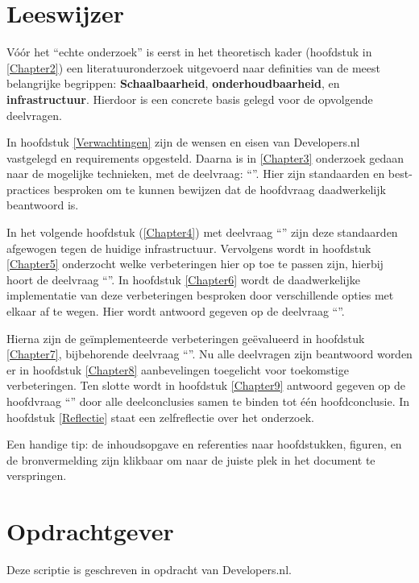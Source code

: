 \section{Leeswijzer}

Vóór het \enquote{echte onderzoek} is eerst in het theoretisch kader (hoofdstuk in \ref{Chapter2}) een literatuuronderzoek uitgevoerd naar definities van de meest belangrijke begrippen: \textbf{Schaalbaarheid}, \textbf{onderhoudbaarheid}, en \textbf{infrastructuur}. Hierdoor is een concrete basis gelegd voor de opvolgende deelvragen. 

In hoofdstuk \ref{Verwachtingen} zijn de wensen en eisen van Developers.nl vastgelegd en requirements opgesteld. Daarna is in \ref{Chapter3} onderzoek gedaan naar de mogelijke technieken, met de deelvraag: \enquote{\deeltechnieken}. Hier zijn standaarden en best-practices besproken om te kunnen bewijzen dat de hoofdvraag daadwerkelijk beantwoord is. 

In het volgende hoofdstuk (\ref{Chapter4}) met deelvraag \enquote{\deelhuidig} zijn deze standaarden afgewogen tegen de huidige infrastructuur. Vervolgens wordt in hoofdstuk \ref{Chapter5} onderzocht welke verbeteringen hier op toe te passen zijn, hierbij hoort de deelvraag \enquote{\deelverbetering}. In hoofdstuk \ref{Chapter6} wordt de daadwerkelijke implementatie van deze verbeteringen besproken door verschillende opties met elkaar af te wegen. Hier wordt antwoord gegeven op de deelvraag \enquote{\deelverbetering}. 

Hierna zijn de geïmplementeerde verbeteringen geëvalueerd in hoofdstuk \ref{Chapter7}, bijbehorende deelvraag \enquote{\deelrequirements}. Nu alle deelvragen zijn beantwoord worden er in hoofdstuk \ref{Chapter8} aanbevelingen toegelicht voor toekomstige verbeteringen. Ten slotte wordt in hoofdstuk \ref{Chapter9} antwoord gegeven op de hoofdvraag \enquote{\hoofdvraagname} door alle deelconclusies samen te binden tot één hoofdconclusie. In hoofdstuk \ref{Reflectie} staat een zelfreflectie over het onderzoek.

Een handige tip: de inhoudsopgave en referenties naar hoofdstukken, figuren, en de bronvermelding zijn klikbaar om naar de juiste plek in het document te verspringen.

\section{Opdrachtgever}

Deze scriptie is geschreven in opdracht van Developers.nl.

